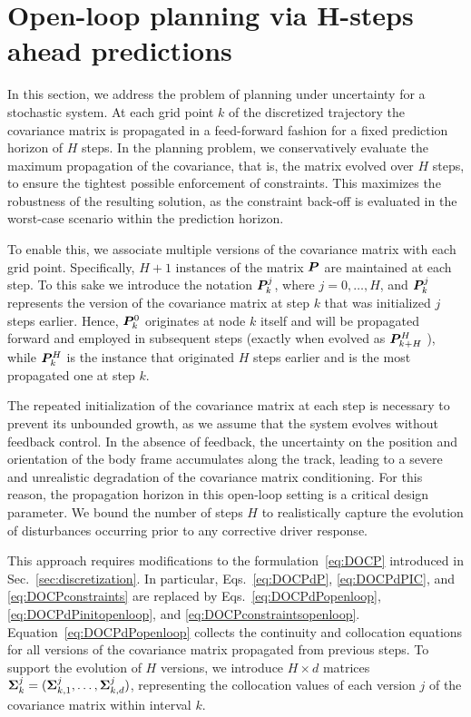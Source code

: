 \section{Open-loop planning via H-steps ahead predictions}
\label{sec:open_loop_planning}
In this section, we address the problem of planning under uncertainty for a stochastic system.
At each grid point $k$ of the discretized trajectory the covariance matrix is propagated in a feed-forward fashion for a fixed prediction horizon of $H$ steps.
In the planning problem, we conservatively evaluate the maximum propagation of the covariance, that is, the matrix evolved over $H$ steps, to ensure the tightest possible enforcement of constraints. This maximizes the robustness of the resulting solution, as the constraint back-off is evaluated in the worst-case scenario within the prediction horizon.

To enable this, we associate multiple versions of the covariance matrix with each grid point. Specifically, $H+1$ instances of the matrix $\boldsymbol{P}$ are maintained at each step. To this sake we introduce the notation $\boldsymbol{P}_k^j$, where $j = 0, \ldots, H$, and $\boldsymbol{P}_k^j$ represents the version of the covariance matrix at step $k$ that was initialized $j$ steps earlier. Hence, $\boldsymbol{P}_k^0$ originates at node $k$ itself and will be propagated forward and employed in subsequent steps (exactly when evolved as $\boldsymbol{P}_{k+H}^H$ ), while $\boldsymbol{P}_k^H$ is the instance that originated $H$ steps earlier and is the most propagated one at step $k$.

The repeated initialization of the covariance matrix at each step is necessary to prevent its unbounded growth, as we assume that the system evolves without feedback control.
In the absence of feedback, the uncertainty on the position and orientation of the body frame accumulates along the track, leading to a severe and unrealistic degradation of the covariance matrix conditioning.
For this reason, the propagation horizon in this open-loop setting is a critical design parameter.
We bound the number of steps $H$ to realistically capture the evolution of disturbances occurring prior to any corrective driver response.

This approach requires modifications to the formulation~\eqref{eq:DOCP} introduced in Sec.~\ref{sec:discretization}. In particular, Eqs.~\eqref{eq:DOCPdP}, \eqref{eq:DOCPdPIC}, and \eqref{eq:DOCPconstraints} are replaced by Eqs.~\eqref{eq:DOCPdPopenloop}, \eqref{eq:DOCPdPinitopenloop}, and \eqref{eq:DOCPconstraintsopenloop}. Equation~\eqref{eq:DOCPdPopenloop} collects the continuity and collocation equations for all versions of the covariance matrix propagated from previous steps. To support the evolution of $H$ versions, we introduce $H \times d$ matrices $\boldsymbol{\Sigma}_k^j = (\boldsymbol{\Sigma}_{k,1}^j, \ldots, \boldsymbol{\Sigma}_{k,d}^j)$, representing the collocation values of each version $j$ of the covariance matrix within interval $k$.


